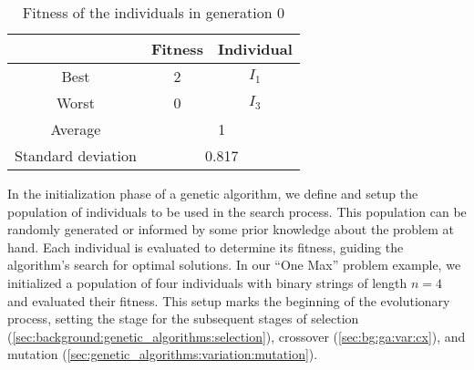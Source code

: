  \begin{table}[H]
    \centering
    \begin{tabular}{|c|c|c|}
      \hline
      & \textbf{Fitness} & \textbf{Individual}  \\
      \hline
      Best & 2 & \(I_1\) \\
      Worst & 0 & \(I_3\) \\
      \hline
      \hline
      Average & \multicolumn{2}{c|}{1} \\
      \hline
      Standard deviation & \multicolumn{2}{c|}{0.817} \\
      \hline
    \end{tabular}
    \caption{Fitness of the individuals in generation 0}
    \label{tab:genetic_algorithms:initialization:population_fitness}
  \end{table}
  
  In the initialization phase of a genetic algorithm, we define and setup the population of 
  individuals to be used in the search process. 
  This population can be randomly generated or informed by some prior knowledge about the problem at 
  hand. 
  Each individual is evaluated to determine its fitness, guiding the algorithm's search for optimal 
  solutions. 
  In our \enquote{One Max} problem example, we initialized a population of four individuals with 
  binary strings of length \(n = 4\) and evaluated their fitness. 
  This setup marks the beginning of the evolutionary process, setting the stage for the subsequent 
  stages of selection (\vref{sec:background:genetic_algorithms:selection}), 
  crossover (\vref{sec:bg:ga:var:cx}), and 
  mutation (\vref{sec:genetic_algorithms:variation:mutation}).
